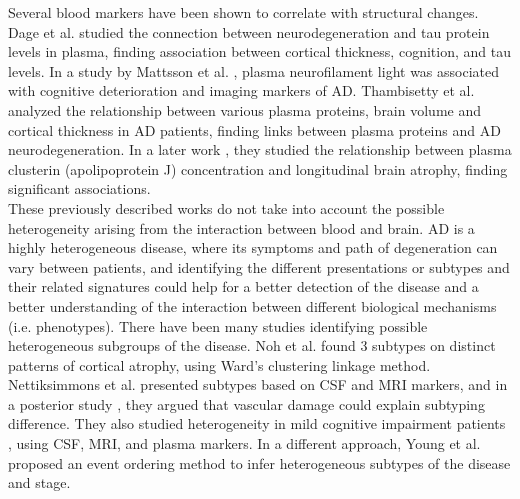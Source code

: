 
Several blood markers have been shown to correlate with structural changes. Dage et al. \cite{Dage2016} studied the connection between neurodegeneration and tau protein levels in plasma, finding association between cortical thickness, cognition, and tau levels. In a study by Mattsson et al. \cite{Mattsson2017}, plasma neurofilament light was associated with cognitive deterioration and imaging markers of AD. Thambisetty et al. \cite{Thambisetty2011} analyzed the relationship between various plasma proteins, brain volume and cortical thickness in AD patients, finding links between plasma proteins and AD neurodegeneration. In a later work \cite{Thambisetty2012}, they studied the relationship between plasma clusterin (apolipoprotein J) concentration and longitudinal brain atrophy, finding significant associations. \\

These previously described works do not take into account the possible heterogeneity arising from the interaction between blood and brain. AD is a highly heterogeneous disease, where its symptoms and path of degeneration can vary between patients, and identifying the different presentations or subtypes and their related signatures could help for a better detection of the disease and a better understanding of the interaction between different biological mechanisms (i.e. phenotypes). There have been many studies identifying possible heterogeneous subgroups of the disease. Noh et al. \cite{Noh2014} found 3 subtypes on distinct patterns of cortical atrophy, using Ward's clustering linkage method. Nettiksimmons et al. \cite{Nettiksimmons2010} presented subtypes based on CSF and MRI markers, and in a posterior study \cite{Nettiksimmons2013}, they argued that vascular damage could explain subtyping difference. They also studied heterogeneity in mild cognitive impairment patients \cite{Nettiksimmons2014}, using CSF, MRI, and plasma markers. In a different approach, Young et al. \cite{Young,Young2017} proposed an event ordering method to infer heterogeneous subtypes of the disease and stage.  \\

